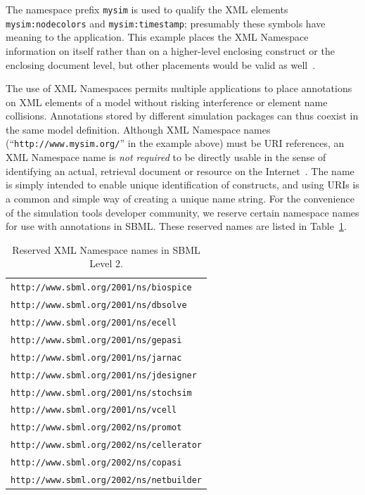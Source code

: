 \documentclass[10pt]{cekarticle}
\newcommand{\vref}[1]{\ref{#1}}
\begin{document}
The namespace prefix \texttt{mysim} is used to qualify the XML elements
\texttt{mysim:nodecolors} and \texttt{mysim:timestamp}; presumably these
symbols have meaning to the application.  This example places the XML
Namespace information on  itself rather than on a
higher-level enclosing construct or the enclosing document level, but other
placements would be valid as well~\citep{bray:1999}.

The use of XML Namespaces permits multiple applications to place
annotations on XML elements of a model without risking interference or
element name collisions.  Annotations stored by different simulation
packages can thus coexist in the same model definition.  Although XML
Namespace names (``\texttt{http://www.mysim.org/}'' in the example above)
must be URI references, an XML Namespace name is \emph{not required} to be
directly usable in the sense of identifying an actual, retrieval document
or resource on the Internet~\citep{bray:1999}.  The name is simply intended
to enable unique identification of constructs, and using URIs is a common
and simple way of creating a unique name string.  For the convenience of
the simulation tools developer community, we reserve certain namespace
names for use with annotations in SBML.  These reserved names are listed in
Table~\vref{tab:reserved-urls}.

\begin{table}[b]
  \vspace*{5pt}
  \centering
  \begin{tabular}{l}
    \toprule
    \texttt{http://www.sbml.org/2001/ns/biospice}\\
    \texttt{http://www.sbml.org/2001/ns/dbsolve}\\
    \texttt{http://www.sbml.org/2001/ns/ecell}\\
    \texttt{http://www.sbml.org/2001/ns/gepasi}\\
    \texttt{http://www.sbml.org/2001/ns/jarnac}\\
    \texttt{http://www.sbml.org/2001/ns/jdesigner}\\
    \texttt{http://www.sbml.org/2001/ns/stochsim}\\
    \texttt{http://www.sbml.org/2001/ns/vcell}\\
    \texttt{http://www.sbml.org/2002/ns/promot}\\
    \texttt{http://www.sbml.org/2002/ns/cellerator}\\
    \texttt{http://www.sbml.org/2002/ns/copasi}\\
    \texttt{http://www.sbml.org/2002/ns/netbuilder}\\
    \bottomrule
  \end{tabular}
  \caption{Reserved XML Namespace names in SBML Level 2.}
  \label{tab:reserved-urls}
\end{table}
\end{document}
